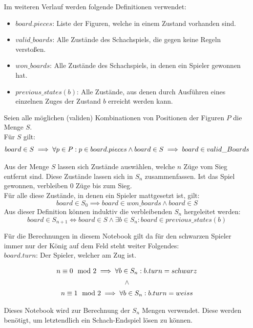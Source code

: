 \documentclass[12pt]{article}
\begin{document}
Im weiteren Verlauf werden folgende Definitionen verwendet: 
\begin{itemize}
	\item \(board.pieces\): Liste der Figuren, welche in einem Zustand vorhanden sind. 
	\item \(valid\_boards\): Alle Zustände des Schachspiels, die gegen keine Regeln verstoßen. 
	\item \(won\_boards\): Alle Zustände des Schachspiels, in denen ein Spieler gewonnen hat. 
	\item \(previous\_states(b)\): Alle Zustände, aus denen durch Ausführen eines einzelnen Zuges der Zustand \(b\) erreicht werden kann.
\end{itemize}


Seien alle möglichen (validen) Kombinationen von Positionen der Figuren
\(P\) die Menge \(S\).\\
Für \(S\) gilt:\\
\[
board \in S \implies \forall p \in P : p \in board.pieces \\
\land \\
board \in S \implies board \in valid\_Boards
\]

Aus der Menge \(S\) lassen sich Zustände auswählen, welche \(n\) Züge
vom Sieg entfernt sind. Diese Zustände lassen sich in \(S_n\)
zusammenfassen. Ist das Spiel gewonnen, verbleiben 0 Züge bis zum
Sieg.\\
Für alle diese Zustände, in denen ein Spieler mattgesetzt ist, gilt:\\
\[
board \in S_0 \implies board \in won\_boards \land board \in S
\] Aus dieser Definition können induktiv die verbleibenden \(S_n\)
hergeleitet werden:\\
\[board \in S_{n+1} \iff board \in S \land \exists b \in S_n: board \in previous\_states(b)\]

Für die Berechnungen in diesem Notebook gilt da für den schwarzen
Spieler immer nur der König auf dem Feld steht weiter Folgendes:\\
\(board.turn\): Der Spieler, welcher am Zug ist.

\[
n \equiv 0 \mod 2 \implies \forall b \in S_n : b.turn = schwarz \\
\]
\[
\land 
\]
\[ 
n \equiv 1 \mod 2 \implies \forall b \in S_n : b.turn = weiss \\
\]

Dieses Notebook wird zur Berechnung der \(S_n\) Mengen verwendet. Diese
werden benötigt, um letztendlich ein Schach-Endspiel lösen zu können.
\end{document}
